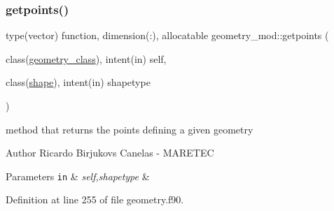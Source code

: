 \subsubsection{\texorpdfstring{getpoints()}{getpoints()}}
{\footnotesize\ttfamily type(vector) function, dimension(\+:), allocatable geometry\+\_\+mod\+::getpoints (\begin{DoxyParamCaption}\item[{class(\mbox{\hyperlink{structgeometry__mod_1_1geometry__class}{geometry\+\_\+class}}), intent(in)}]{self,  }\item[{class(\mbox{\hyperlink{structgeometry__mod_1_1shape}{shape}}), intent(in)}]{shapetype }\end{DoxyParamCaption})\hspace{0.3cm}{\ttfamily [private]}}



method that returns the points defining a given geometry 

\begin{DoxyAuthor}{Author}
Ricardo Birjukovs Canelas -\/ M\+A\+R\+E\+T\+EC 
\end{DoxyAuthor}

\begin{DoxyParams}[1]{Parameters}
\mbox{\tt in}  & {\em self,shapetype} & \\
\hline
\end{DoxyParams}


Definition at line 255 of file geometry.\+f90.


